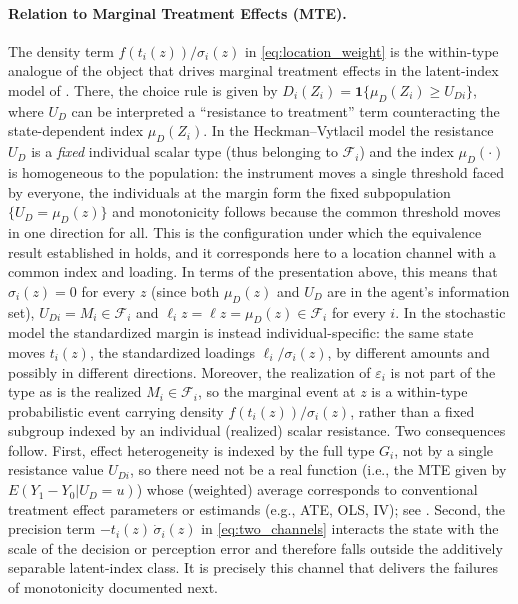 \documentclass[11pt]{article}
\newcommand{\1}{\mathbf{1}}
\begin{document}
\paragraph{Relation to Marginal Treatment Effects (MTE).}
The density term \(f(t_i(z))/\sigma_i(z)\) in \eqref{eq:location_weight} is
the within-type analogue of the object that drives marginal treatment
effects in the latent-index model of \citet{HeckmanVytlacil2005}. There, the choice rule is given by
\(D_i(Z_i)=\1\{\mu_D(Z_i) \geq U_{Di}\}\), 
where $U_D$ can be interpreted a ``resistance to treatment'' term counteracting the state-dependent index \(\mu_D(Z_i)\).  In the Heckman--Vytlacil model the resistance
\(U_D\) is a \emph{fixed} individual scalar type (thus belonging to $\mathcal{F}_i$) and the index \(\mu_D(\cdot)\) is homogeneous
to the population: the instrument moves a single threshold faced by
everyone, the individuals at the margin form the fixed subpopulation
\(\{U_D=\mu_D(z)\}\) and monotonicity follows because the common threshold
moves in one direction for all. This is the configuration under
which the equivalence result established in \citet{vytlacil2002} holds, and it corresponds
here to a location channel with a common index and loading.  In terms of the presentation above, this means that $\sigma_i(z)=0$ for every $z$ (since both $\mu_D(z)$ and $U_D$ are in the agent's information set), $U_{Di}=M_i \in \mathcal{F}_i$ and $\ell_i z = \ell z = \mu_D(z) \in \mathcal{F}_i$ for every $i$.  In the stochastic
model the standardized margin is instead individual-specific: the same
state moves \(t_i(z)\), the standardized loadings
\(\ell_i/\sigma_i(z)\), by different amounts and possibly
in different directions. Moreover, the realization of \(\varepsilon_i\) is
not part of the type as is the realized $M_i \in \mathcal{F}_i$, so the marginal event at \(z\) is a within-type
probabilistic event carrying density \(f(t_i(z))/\sigma_i(z)\), rather than
a fixed subgroup indexed by an individual (realized) scalar resistance. Two consequences follow.
First, effect heterogeneity is indexed by the full type \(G_i\), not by a
single resistance value \(U_{Di}\), so there need not be a real function (i.e., the MTE given by $E(Y_1-Y_0|U_D=u)$) whose (weighted) average corresponds to conventional treatment effect parameters or estimands (e.g., ATE, OLS, IV); see
\citet{HeckmanUrzuaVytlacil2006}. Second, the precision term
\(-t_i(z)\,\dot\sigma_i(z)\) in \eqref{eq:two_channels} interacts the state
with the scale of the decision or perception error and therefore falls outside the
additively separable latent-index class. It is precisely this channel that
delivers the failures of monotonicity documented next.
\end{document}
